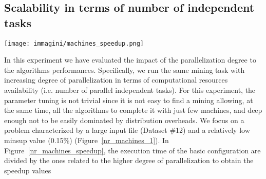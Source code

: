 
\subsection{Scalability in terms of number of independent tasks}
\label{nr_machines}



\begin{figure*}[!t]
\begin{center}
\texttt{[image: immagini/machines\_speedup.png]}
\caption{Speedup with different parallelization degrees (Dataset \#12,
 $minsup$~0.15\%,
 average transaction length~10)}
\label{nr_machines_speedup}
\end{center}
\end{figure*}



In this experiment we have evaluated the impact of the parallelization degree to the algorithms performances. Specifically, we run the same mining task with increasing degree of parallelization in terms of computational resources availability (i.e. number of parallel independent tasks). For this experiment, the parameter tuning is not trivial since it is not easy to find a mining allowing, at the same time, all the algorithms to complete it with just few machines, and deep enough not to be easily dominated by distribution overheads. We focus on a problem characterized by a large input file (Dataset \#12) and a relatively low minsup value (0.15\%) (Figure~\ref{nr_machines_1}). 
In Figure~\ref{nr_machines_speedup}, the execution time of the basic configuration are divided by the ones related to the higher degree of parallelization to obtain the speedup values


